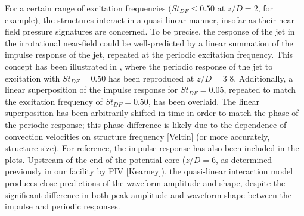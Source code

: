 For a certain range of excitation frequencies ($St_{DF} \leq 0.50$ at $z/D = 2$, for example), the structures interact in a quasi-linear manner, insofar as their near-field pressure signatures are concerned. 
To be precise, the response of the jet in the irrotational near-field could be well-predicted by a linear summation of the impulse response of the jet, repeated at the periodic excitation frequency. 
This concept has been illustrated in , where the periodic response of the jet to excitation with $St_{DF} = 0.50$ has been reproduced at $z/D = 3$ 8. 
Additionally, a linear superposition of the impulse response for $St_{DF} = 0.05$, repeated to match the excitation frequency of $St_{DF} = 0.50$, has been overlaid. 
The linear superposition has been arbitrarily shifted in time in order to match the phase of the periodic response; this phase difference is likely due to the dependence of convection velocities on structure frequency [Veltin] (or more accurately, structure size). 
For reference, the impulse response has also been included in the plots. 
Upstream of the end of the potential core ($z/D = 6$, as determined previously in our facility by PIV [Kearney]), the quasi-linear interaction model produces close predictions of the waveform amplitude and shape, despite the significant difference in both peak amplitude and waveform shape between the impulse and periodic responses. 


